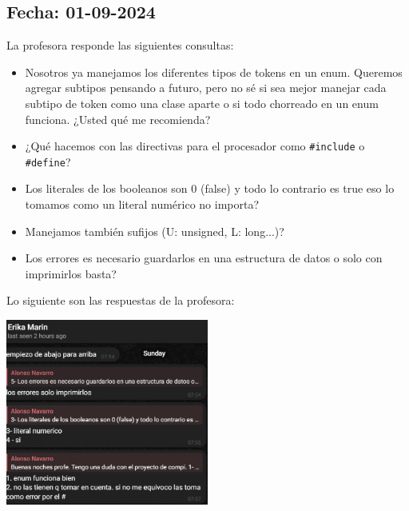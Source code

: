 \documentclass[a4paper,12pt]{article}
\begin{document}
\subsection*{Fecha: 01-09-2024}
\begin{flushleft}
    La profesora responde las siguientes consultas:
    \begin{itemize}
        \item Nosotros ya manejamos los diferentes tipos de 
        tokens en un enum. Queremos agregar subtipos pensando 
        a futuro, pero no sé si sea mejor manejar cada 
        subtipo de token como una clase aparte o si todo 
        chorreado en un enum funciona. ¿Usted qué me recomienda?
        \item ¿Qué hacemos con las directivas para el procesador 
        como \texttt{\#include} o \texttt{\#define}?
        \item Los literales de los booleanos son 0 (false) y 
        todo lo contrario es true eso lo tomamos como un 
        literal numérico no importa?
        \item Manejamos también sufijos (U: unsigned, L: long...)?
        \item Los errores es necesario guardarlos en una estructura de datos o solo con imprimirlos basta?
    \end{itemize}
    Lo siguiente son las respuestas de la profesora:\par\vspace{1em}
    \centering
    \includegraphics[width=0.5\textwidth]{respuestas-1.png}\par
\end{flushleft}
\end{document}
